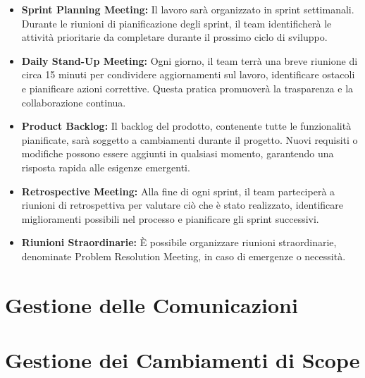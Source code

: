 \begin{itemize}
    \item \textbf{Sprint Planning Meeting:} Il lavoro sarà organizzato in sprint settimanali. Durante le riunioni di pianificazione degli sprint, il team identificherà le attività prioritarie da completare durante il prossimo ciclo di sviluppo.
    \item \textbf{Daily Stand-Up Meeting:} Ogni giorno, il team terrà una breve riunione di circa 15 minuti per condividere aggiornamenti sul lavoro, identificare ostacoli e pianificare azioni correttive. Questa pratica promuoverà la trasparenza e la collaborazione continua.
    \item \textbf{Product Backlog:} Il backlog del prodotto, contenente tutte le funzionalità pianificate, sarà soggetto a cambiamenti durante il progetto. Nuovi requisiti o modifiche possono essere aggiunti in qualsiasi momento, garantendo una risposta rapida alle esigenze emergenti.
    \item \textbf{Retrospective Meeting:} Alla fine di ogni sprint, il team parteciperà a riunioni di retrospettiva per valutare ciò che è stato realizzato, identificare miglioramenti possibili nel processo e pianificare gli sprint successivi.
    \item \textbf{Riunioni Straordinarie:} È possibile organizzare riunioni straordinarie, denominate Problem Resolution Meeting, in caso di emergenze o necessità.
\end{itemize}

\section{Gestione delle Comunicazioni}


\section{Gestione dei Cambiamenti di Scope}
